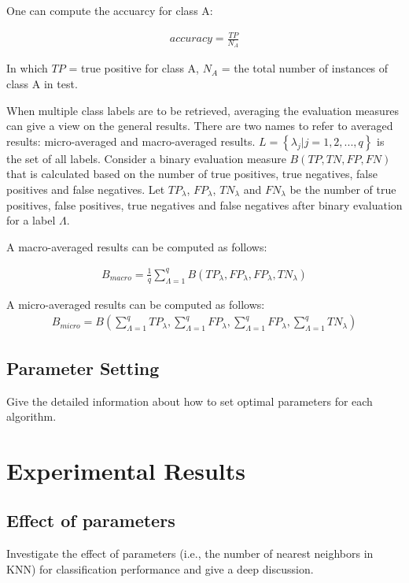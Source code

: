 \documentclass[11pt]{article}
\begin{document}
One can compute the accuarcy for class A:


\begin{gather}
accuracy = \frac{TP}{N_{A}}
\end{gather}


In which $TP$ = true positive for class A, $N_{A}$ = the total number of instances of class A in test.

When multiple class labels are to be retrieved, averaging the evaluation measures can give a view on the general results. There are two names to refer to averaged results: micro-averaged and macro-averaged results. $L = \left\{\lambda_{j}|j = 1,2,...,q\right\}$ is the set of all labels. Consider a binary evaluation measure $B(TP,TN,FP,FN)$ that is calculated based on the number of true positives, true negatives, false positives and false negatives. Let $TP_{\lambda}$, $FP_{\lambda}$, $TN_{\lambda}$ and $FN_{\lambda}$ be the number of true positives, false positives, true negatives and false negatives after binary evaluation for a label $\Lambda$.

A macro-averaged results can be computed as follows:


\begin{gather}
B_{macro} = \frac{1}{q}\sum_{\Lambda=1}^{q}B\left(TP_{\lambda},FP_{\lambda},FP_{\lambda},TN_{\lambda}\right)
\end{gather}


A micro-averaged results can be computed as follows:
\begin{gather}
B_{micro} = B\left(\sum_{\Lambda=1}^{q}TP_{\lambda},\sum_{\Lambda=1}^{q}FP_{\lambda},\sum_{\Lambda=1}^{q}FP_{\lambda},\sum_{\Lambda=1}^{q}TN_{\lambda}\right)
\end{gather}

\subsection{Parameter Setting}
{\color{red} Give the detailed information about how to set optimal parameters for each algorithm.}



\section{Experimental Results}


\subsection{Effect of parameters}
{\color{red} Investigate the effect of parameters (i.e., the number of nearest neighbors in KNN) for classification performance and give a deep discussion.}
\end{document}
